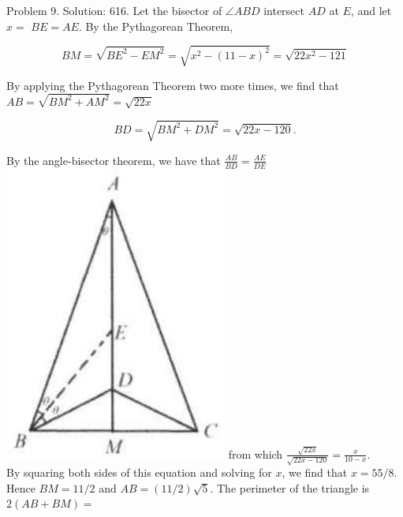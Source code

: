 \documentclass[10pt]{article}
\begin{document}
Problem 9. Solution: 616.
Let the bisector of \(\angle A B D\) intersect \(A D\) at \(E\), and let \(x=\) \(B E=A E\). By the Pythagorean Theorem,

\[
B M=\sqrt{B E^{2}-E M^{2}}=\sqrt{x^{2}-(11-x)^{2}}=\sqrt{22 x^{2}-121}
\]

By applying the Pythagorean Theorem two more times, we find that \(A B=\sqrt{B M^{2}+A M^{2}}=\sqrt{22 x}\)

\[
B D=\sqrt{B M^{2}+D M^{2}}=\sqrt{22 x-120} .
\]

By the angle-bisector theorem, we have that \(\frac{A B}{B D}=\frac{A E}{D E}\)\\
\includegraphics[max width=\textwidth]{2025_04_17_97bc1f7e44d93c271a88g-070(1)} from which \(\frac{\sqrt{22 x}}{\sqrt{22 x-120}}=\frac{x}{10-x}\).\\
By squaring both sides of this equation and solving for \(x\), we find that \(x=55 / 8\). Hence \(B M=11 / 2\) and \(A B=(11 / 2) \sqrt{5}\). The perimeter of the triangle is \(2(A B+B M)=\)
\end{document}
